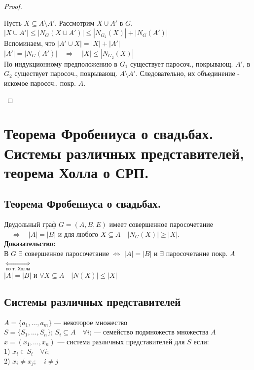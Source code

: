 \documentclass[12pt]{article}
\begin{document}
\begin{proof}
\begin{description}
\begin{enumerate}
						Пусть $X\subseteq A \setminus A'$. Рассмотрим $X \cup A'$ в $G$.\\
						$|X \cup A'| \le |N_G(X \cup A')| \le |N_{G_2}(X)| + |N_G(A')|$\\
						Вспоминаем, что $|A' \cup X| = |X| + |A'|$\\
						$|A'| = |N_G(A')|  \quad  \Rightarrow  \quad |X| \le |N_{G_2}(X)|$\\
						По индукционному предположению в $G_1$ существует паросоч., покрывающ. $A'$, в $G_2$ существует паросоч., покрывающ. $A\setminus A'$.
						Следовательно, их объединение - искомое паросоч., покр. $A$.
				\end{enumerate}
		\end{description}
	\end{proof}
\section{Теорема Фробениуса о свадьбах. Системы различных представителей, теорема Холла о СРП.}
	\subsection{Теорема Фробениуса о свадьбах.}
			Двудольный граф $G=(A,B,E)$ имеет совершенное паросочетание $ \quad \Leftrightarrow \quad |A|=|B|$ и для любого $X \subseteq A \quad |N_G(X)| \ge |X|$.\\
		\textbf{Доказательство:}\\
			В $G$ $\exists$ совершенное паросочетание $\Leftrightarrow$ $|A| = |B|$ и $\exists$ паросочетание покр. $A$ $\underset{\text{по т. Холла}}{\Leftrightarrow}$ \\$|A| = |B|$ и $\forall X \subseteq A \quad |N(X)| \leqslant |X|$\\
		\qedsymbol
	\subsection{Системы различных представителей}
		$A = \{a_1,\dotsc,a_m\}$ — некоторое множество\\
		$S = \{S_1,\dotsc,S_n\}$; $S_i \subseteq A \quad \forall i$; — семейство подмножеств множества $A$\\
		$x = (x_1,\dotsc,x_n)$ — система различных представителей для $S$ если:\\
		1) $x_i \in S_i \quad \forall i$;\\
		2) $x_i \neq x_j; \quad i \neq j$
\end{document}
